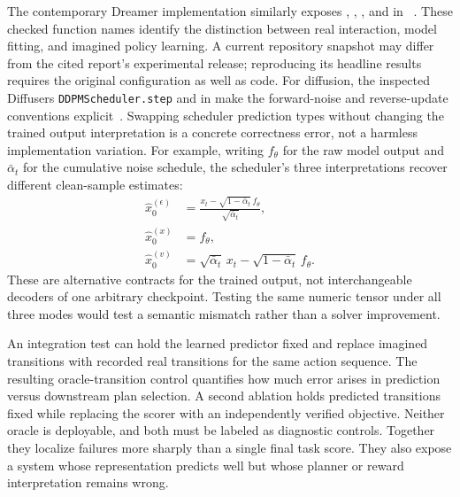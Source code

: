 The contemporary Dreamer implementation similarly exposes , , , and  in ~\cite{rewrite_dreamer_repo}. These checked function names identify the distinction between real interaction, model fitting, and imagined policy learning. A current repository snapshot may differ from the cited report's experimental release; reproducing its headline results requires the original configuration as well as code. For diffusion, the inspected Diffusers \texttt{DDPMScheduler.step} and  in  make the forward-noise and reverse-update conventions explicit~\cite{rewrite_diffusers_repo}. Swapping scheduler prediction types without changing the trained output interpretation is a concrete correctness error, not a harmless implementation variation. For example, writing $f_\theta$ for the raw model output and $\bar\alpha_t$ for the cumulative noise schedule, the scheduler's three interpretations recover different clean-sample estimates:
\begin{equation}
\begin{aligned}
 \widehat x_0^{(\epsilon)}
 &=\frac{x_t-\sqrt{1-\bar\alpha_t}\,f_\theta}
          {\sqrt{\bar\alpha_t}},\\
 \widehat x_0^{(x)}&=f_\theta,\\
 \widehat x_0^{(v)}
 &=\sqrt{\bar\alpha_t}\,x_t-\sqrt{1-\bar\alpha_t}\,f_\theta.
\end{aligned}
\end{equation}
These are alternative contracts for the trained output, not interchangeable decoders of one arbitrary checkpoint. Testing the same numeric tensor under all three modes would test a semantic mismatch rather than a solver improvement.

An integration test can hold the learned predictor fixed and replace imagined transitions with recorded real transitions for the same action sequence. The resulting oracle-transition control quantifies how much error arises in prediction versus downstream plan selection. A second ablation holds predicted transitions fixed while replacing the scorer with an independently verified objective. Neither oracle is deployable, and both must be labeled as diagnostic controls. Together they localize failures more sharply than a single final task score. They also expose a system whose representation predicts well but whose planner or reward interpretation remains wrong.

